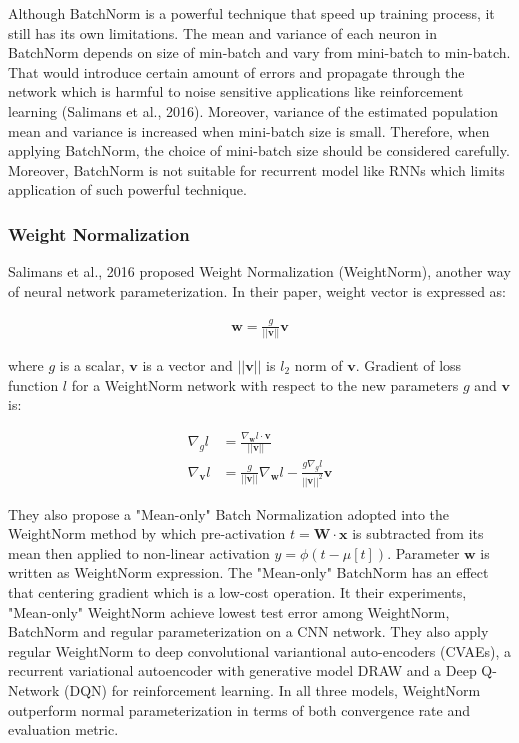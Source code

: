 \documentclass{article}
\begin{document}
Although BatchNorm is a powerful technique that speed up training process, it still has its own limitations. The mean and variance of each neuron in BatchNorm depends on size of min-batch and vary from mini-batch to min-batch. That would introduce certain amount of errors and propagate through the network which is harmful to noise sensitive applications like reinforcement learning (Salimans et al., 2016). Moreover, variance of the estimated population mean and variance is increased when mini-batch size is small. Therefore, when applying BatchNorm, the choice of mini-batch size should be considered carefully. Moreover, BatchNorm is not suitable for recurrent model like RNNs which limits application of such powerful technique.

\subsubsection{Weight Normalization}
Salimans et al., 2016 proposed Weight Normalization (WeightNorm), another way of neural network parameterization. In their paper, weight vector is expressed as:

\begin{align*}
    \textbf{w}=\frac{g}{||\textbf{v}||}\textbf{v}
\end{align*}

where $g$ is a scalar, $\textbf{v}$ is a vector and $||\textbf{v}||$ is $l_2$ norm of $\textbf{v}$. Gradient of loss function $l$  for a WeightNorm network with respect to the new parameters $g$ and $\textbf{v}$ is:

\begin{align*}
    \nabla_gl &= \frac{\nabla_{\textbf{w}}l\cdot\textbf{v}}{||\textbf{v}||}\\
    \nabla_{\textbf{v}}l &= \frac{g}{||\textbf{v}||}\nabla_{\textbf{w}}l-\frac{g\nabla_gl}{||\textbf{v}||^2}\textbf{v}
\end{align*}

They also propose a "Mean-only" Batch Normalization adopted into the WeightNorm method by which pre-activation $t=\textbf{W}\cdot\textbf{x}$ is subtracted from its mean then applied to non-linear activation $y=\phi(t-\mu[t])$. Parameter $\textbf{w}$ is written as WeightNorm expression. The "Mean-only" BatchNorm has an effect that centering gradient which is a low-cost operation. It their experiments, "Mean-only" WeightNorm achieve lowest test error among WeightNorm, BatchNorm and regular parameterization on a CNN network. They also apply regular WeightNorm to deep convolutional variantional auto-encoders (CVAEs), a recurrent variational autoencoder with generative model DRAW and  a Deep Q-Network (DQN) for reinforcement learning. In all three models, WeightNorm outperform normal parameterization in terms of both convergence rate and evaluation metric.
\end{document}
